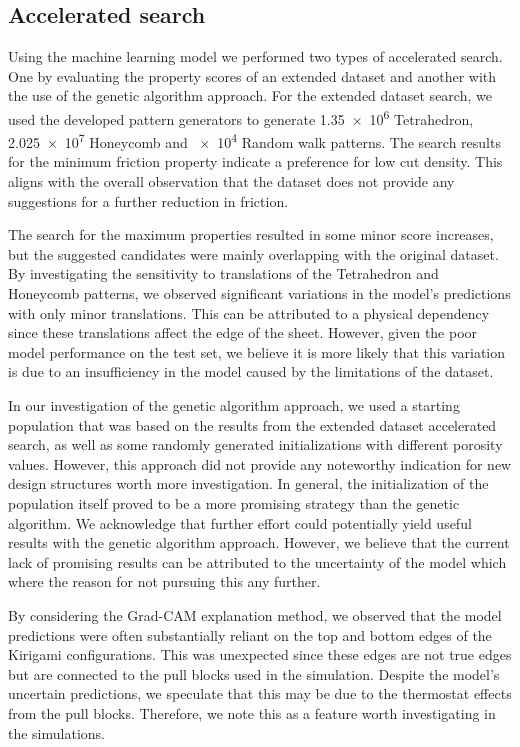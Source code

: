 \subsection{Accelerated search}
Using the machine learning model we performed two types of accelerated search. One
by evaluating the property scores of an extended dataset and another with the
use of the genetic algorithm approach. For the extended dataset search, we used
the developed pattern generators to generate \num{1.35e6} Tetrahedron,
\num{2.025e7} Honeycomb and \num{e4} Random walk patterns. The search results
for the minimum friction property indicate a preference for low cut density. This aligns with the overall observation that the dataset does not
provide any suggestions for a further reduction in friction.

The search for the maximum properties resulted in some minor score increases, but
the suggested candidates were mainly overlapping with the original dataset. By investigating the sensitivity to translations of the Tetrahedron and Honeycomb patterns, we observed significant variations in the model's predictions with only minor translations. This can be attributed to a physical dependency since these translations affect the edge of the sheet. However, given the poor model performance on the test set, we believe it is more likely that this variation is due to an insufficiency in the model caused by the limitations of the dataset.

In our investigation of the genetic algorithm approach, we used a starting population that was based on the results from the extended dataset accelerated search, as well as some randomly generated initializations with different porosity values. However, this approach did not provide any noteworthy
indication for new design structures worth more investigation. In general, the
initialization of the population itself proved to be a more promising strategy
than the genetic algorithm. We acknowledge that further effort could potentially yield useful results with the genetic algorithm approach. However, we believe that the current lack of promising results can be attributed to the uncertainty of the model which where the reason for not pursuing this any further.

By considering the Grad-CAM explanation method, we observed that the model predictions were often substantially reliant on the top and bottom edges of the Kirigami configurations. This was unexpected since these edges are not true edges but are connected to the pull blocks used in the simulation. Despite the model's uncertain predictions, we speculate that this may be due to the thermostat effects from the pull blocks. Therefore, we note this as a feature worth investigating in the simulations.


